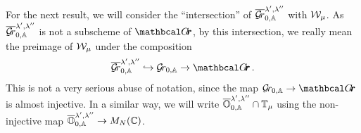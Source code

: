 \documentclass{article} %
\begin{document}
For the next result, we will consider the ``intersection'' of $ \overline{\mathcal{G}\!r}^{\lambda', \lambda''}_{0,\mathbb A} $ with $\mathcal W_\mu$.  
As $  \overline{\mathcal{G}\!r}^{\lambda', \lambda''}_{0,\mathbb A} $ is not a subscheme of $ \Grth$, by this intersection, we really mean the preimage of $ \mathcal W_\mu$ under the composition
$$ 
    \overline{\Gr}^{\lambda', \lambda''}_{0,\AA}  \hookrightarrow \Grbd \rightarrow \Grth\,.
$$
This is not a very serious abuse of notation, since the map $ \Grbd \rightarrow \Grth $ is almost injective. 
In a similar way, we will write $ \overline{\mathbb O}^{\lambda', \lambda''}_{0,\mathbb A} \cap \mathbb T_\mu$ using the non-injective map $ \overline{\mathbb O}^{\lambda', \lambda''}_{0,\mathbb A} \rightarrow M_N(\mathbb C)$. 
\end{document}
